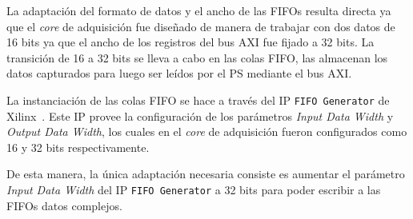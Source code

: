 \documentclass[../../main.tex]{subfiles}
\begin{document}
\begin{table}[H]
    \centering
    \caption{Diferencias a salvar para lograr la integración de la etapa de preprocesamiento.}\label{tab::diferencias-integracion}
    \end{table}

La adaptación del formato de datos y el ancho de las FIFOs resulta directa ya que el \textit{core} de adquisición fue diseñado de manera de trabajar con dos datos de 16 bits ya que el ancho de los registros del bus AXI fue fijado a 32 bits. La transición de 16 a 32 bits se lleva a cabo en las colas FIFO, las almacenan los datos capturados para luego ser leídos por el PS mediante el bus AXI.

La instanciación de las colas FIFO se hace a través del IP \texttt{FIFO Generator} de Xilinx~\cite{fifo-generator}. Este IP provee la configuración de los parámetros \textit{Input Data Width} y \textit{Output Data Width}, los cuales en el \textit{core} de adquisición fueron configurados como 16 y 32 bits respectivamente.

De esta manera, la única adaptación necesaria consiste es aumentar el parámetro \textit{Input Data Width} del IP \texttt{FIFO Generator} a 32 bits para poder escribir a las FIFOs datos complejos.
\end{document}
